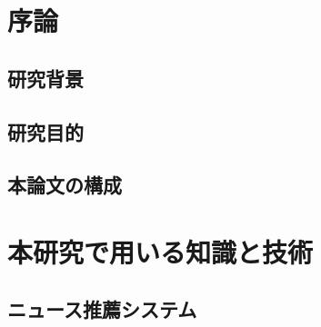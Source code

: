 \documentclass[12pt,a4j]{jreport}
\begin{document}



\chapter{序論}

\section{研究背景}


\section{研究目的}


\section{本論文の構成}


\chapter{本研究で用いる知識と技術}


\section{ニュース推薦システム}
\end{document}
